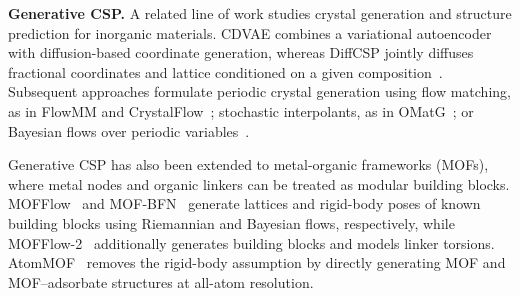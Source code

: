 

\textbf{Generative CSP.}
A related line of work studies crystal generation and structure prediction for
inorganic materials. CDVAE combines a variational autoencoder with diffusion-based
coordinate generation, whereas DiffCSP jointly diffuses fractional coordinates and
lattice conditioned on a given
composition~\citep{xie2022crystal,jiao2024crystal}. Subsequent approaches formulate
periodic crystal generation using flow matching, as in FlowMM and
CrystalFlow~\citep{millerflowmm,luo2025crystalflow}; stochastic interpolants, as in
OMatG~\citep{hollmeropen}; or Bayesian flows over periodic
variables~\citep{wu2025periodic}.

Generative CSP has also been extended to metal-organic frameworks (MOFs), 
where metal nodes and organic linkers can be treated as modular building blocks. 
MOFFlow~\citep{kim2025mofflow} and MOF-BFN~\citep{jiao2025mof} generate lattices 
and rigid-body poses of known building blocks using Riemannian and Bayesian flows, 
respectively, while MOFFlow-2~\citep{kim2025flexible} additionally generates building
blocks and models linker torsions. AtomMOF~\citep{kim2026atommof} removes the rigid-body
assumption by directly generating MOF and MOF--adsorbate structures at all-atom resolution.